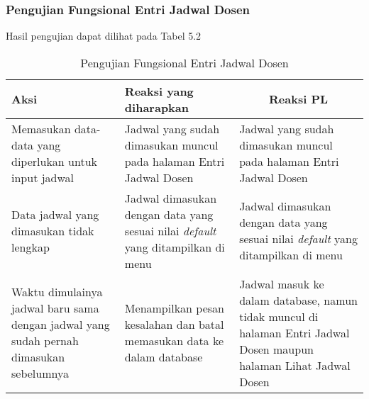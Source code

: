 \subsubsection{Pengujian Fungsional Entri Jadwal Dosen}
Hasil pengujian dapat dilihat pada Tabel 5.2
\begin{center}
	\begin{table}[H]
		\caption{Pengujian Fungsional Entri Jadwal Dosen}
		\begin{tabular}{|p{5cm}|p{5cm}|p{5cm}|}
		\hline
		\centering Aksi	& 	\centering Reaksi yang diharapkan &  \multicolumn{1}{c|}{Reaksi PL} \\
		\hline
		Memasukan data-data yang diperlukan untuk input jadwal & Jadwal yang sudah dimasukan muncul pada halaman Entri Jadwal Dosen & Jadwal yang sudah dimasukan muncul pada halaman Entri Jadwal Dosen \\
		\hline
		Data jadwal yang dimasukan tidak lengkap & Jadwal dimasukan dengan data yang sesuai nilai \textit{default} yang ditampilkan di menu & Jadwal dimasukan dengan data yang sesuai nilai \textit{default} yang ditampilkan di menu \\
		\hline
		Waktu dimulainya jadwal baru sama dengan jadwal yang sudah pernah dimasukan sebelumnya & Menampilkan pesan kesalahan dan batal memasukan data ke dalam database & Jadwal masuk ke dalam database, namun tidak muncul di halaman Entri Jadwal Dosen maupun halaman Lihat Jadwal Dosen \\
		\hline
		\end{tabular}
	\end{table}
\end{center}

